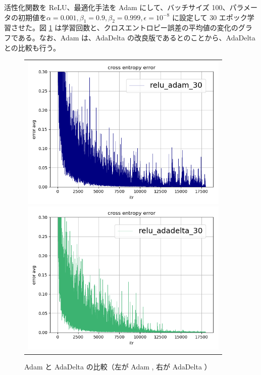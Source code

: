 \documentclass[a4paper,dvipdfmx]{jsarticle}
\begin{document}
活性化関数を ReLU、最適化手法を Adam にして、バッチサイズ 100、パラメータの初期値を$\alpha = 0.001, \beta_1 = 0.9, \beta_2 = 0.999, \epsilon = 10^{-8}$ に設定して 30 エポック学習させた。図 \ref{fig-A4-5-1} は学習回数と、クロスエントロピー誤差の平均値の変化のグラフである。なお、Adam は、AdaDelta の改良版であるとのことから、AdaDelta との比較も行う。

\begin{figure}[H]
  \begin{center}
    \begin{tabular}{c}
      \begin{minipage}{0.5\hsize}
        \begin{center}
          \includegraphics[clip, width=10.0cm]{./report_a4-5-1.png}
        \end{center}
      \end{minipage}
      \begin{minipage}{0.5\hsize}
        \begin{center}
          \includegraphics[clip, width=10.0cm]{./report_a4-5-2.png}
        \end{center}
      \end{minipage}
    \end{tabular}
    \caption{ Adam と AdaDelta の比較（左が Adam , 右が AdaDelta ）}
    \label{fig-A4-5-1}
  \end{center}
\end{figure}
\end{document}
